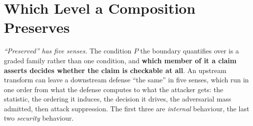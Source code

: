 \documentclass{article}
\begin{document}
\section{Which Level a Composition Preserves}
\label{sec:framework}

\emph{``Preserved'' has five senses.} The condition $P$ the boundary quantifies over is a graded family rather than one condition, and \textbf{which member of it a claim asserts decides whether the claim is checkable at all}. An upstream transform can leave a downstream defense ``the same'' in five senses, which run in one order from what the defense computes to what the attacker gets: the statistic, the ordering it induces, the decision it drives, the adversarial mass admitted, then attack suppression. The first three are \emph{internal} behaviour, the last two \emph{security} behaviour.
\end{document}
